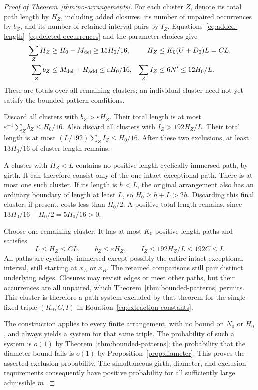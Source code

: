 \begin{proof}[Proof of Theorem~\ref{thm:no-arrangements}]
For each cluster $Z$, denote its total path length by $H_Z$, including
added closures, its number of unpaired occurrences by $b_Z$, and its
number of retained interval pairs by $I_Z$.  Equations~\ref{eq:added-length}--\ref{eq:deleted-occurrences}
and the parameter choices give
\begin{align}
 \sum_Z H_Z&\ge H_0-M_{\mathrm{del}}\ge15H_0/16,
 & H_Z&\le K_0(U+D_0)L=CL,\notag\\
 \sum_Z b_Z&\le M_{\mathrm{del}}+H_{\mathrm{add}}
                \le\varepsilon H_0/16,
 &\sum_Z I_Z&\le6N'\le12H_0/L.
 \label{eq:cluster-budgets}
\end{align}
These are totals over all remaining clusters; an individual cluster
need not yet satisfy the bounded-pattern conditions.

Discard all clusters with $b_Z>\varepsilon H_Z$.  Their total length
is at most $\varepsilon^{-1}\sum_Z b_Z\le H_0/16$.  Also discard all
clusters with $I_Z>192H_Z/L$.  Their total length is at most
$(L/192)\sum_Z I_Z\le H_0/16$.  After these two exclusions, at least
$13H_0/16$ of cluster length remains.

A cluster with $H_Z<L$ contains no positive-length cyclically immersed
path, by girth.  It can therefore consist only of the one intact
exceptional path.  There is at most one such cluster.  If its length
is $h<L$, the original arrangement also has an ordinary boundary of
length at least $L$, so $H_0\ge h+L>2h$.  Discarding this final cluster,
if present, costs less than $H_0/2$.  A positive total length remains,
since $13H_0/16-H_0/2=5H_0/16>0$.

Choose one remaining cluster.  It has at most $K_0$ positive-length
paths and satisfies
\[
 L\le H_Z\le CL,\qquad b_Z\le\varepsilon H_Z,\qquad
 I_Z\le192H_Z/L\le192C\le I.
\]
All paths are cyclically immersed except possibly the entire intact
exceptional interval, still starting at $x_A$ or $x_B$.  The retained
comparisons still pair distinct underlying edges.  Closures may
revisit edges or meet other paths, but their occurrences are all
unpaired, which Theorem~\ref{thm:bounded-patterns} permits.  This
cluster is therefore a path system excluded by that theorem for the
single fixed triple $(K_0,C,I)$ in
Equation~\ref{eq:extraction-constants}.

The construction applies to every finite arrangement, with no bound on
$N_0$ or $H_0$, and always yields a system for that same triple.
The probability of such a system is $o(1)$ by
Theorem~\ref{thm:bounded-patterns}; the probability that the diameter
bound fails is $o(1)$ by Proposition~\ref{prop:diameter}.  This proves
the asserted exclusion probability.  The simultaneous girth,
diameter, and exclusion requirements consequently have positive
probability for all sufficiently large admissible $m$.
\end{proof}
